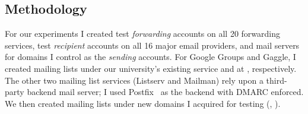 
\subsection{Methodology}
\label{sec:methodology}


For our experiments I created test \textit{forwarding} accounts on all 20 forwarding services,
test \textit{recipient} accounts on all 16 major
email providers, and mail servers for domains I control as
the \textit{sending} accounts.
%
%
For Google Groups and Gaggle, I created mailing lists under our
university's existing service and at , respectively.
The other two mailing list services (Listserv and Mailman) rely upon a
third-party backend mail server; I used
Postfix~\cite{ThePostf34:online} as the backend with DMARC
enforced. We then created mailing lists under new domains I acquired
for testing (\eg, ).



